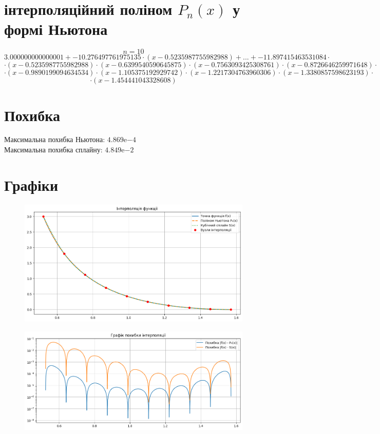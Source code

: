 \documentclass{article}
\begin{document}
    \section{інтерполяційний поліном $P_n(x)$ у формі Ньютона}
    $$n = 10$$
    $$3.000000000000001 + -10.276497761975135 \cdot (x - 0.5235987755982988) + ... + -11.897415463531084 \cdot$$
    $$\cdot (x - 0.5235987755982988) \cdot (x - 0.6399540590645875) \cdot (x - 0.7563093425308761) \cdot (x - 0.8726646259971648) \cdot$$
    $$\cdot (x - 0.9890199094634534) \cdot (x - 1.105375192929742) \cdot (x - 1.2217304763960306) \cdot (x - 1.3380857598623193) \cdot$$
    $$\cdot (x - 1.454441043328608)$$

    \section{Похибка}
    Максимальна похибка Ньютона: $4.869\mathrm{e}{-4}$\\
    Максимальна похибка сплайну: $4.849\mathrm{e}{-2}$

    \section{Графіки}
    \begin{figure}[h!]
        \centering
        \includegraphics[scale=0.5]{Interpolation.png}
    \end{figure}

    \begin{figure}[h!]
        \centering
        \includegraphics[scale=0.5]{Error.png}
    \end{figure}
\end{document}
